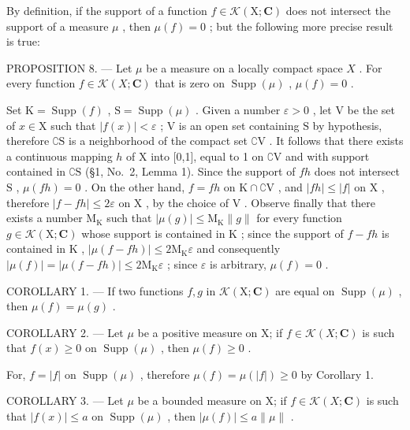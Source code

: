 By definition, if the support of a function \(f \in \mathcal{K}(\mathrm{X};\mathbf{C})\) does not intersect the support of a measure \(\mu\) , then \(\mu(f) = 0\) ; but the following more precise result is true:

PROPOSITION 8. --- Let \(\mu\) be a measure on a locally compact space \(X\) . For every function \(f \in \mathcal{K}(X; \mathbf{C})\) that is zero on \(\operatorname{Supp}(\mu)\) , \(\mu(f) = 0\) .

Set \(\mathrm{K} = \operatorname{Supp}(f)\) , \(\mathrm{S} = \operatorname{Supp}(\mu)\) . Given a number \(\varepsilon > 0\) , let \(\mathrm{V}\) be the set of \(x \in \mathrm{X}\) such that \(|f(x)| < \varepsilon\) ; \(\mathrm{V}\) is an open set containing \(\mathrm{S}\) by hypothesis, therefore \(\complement \mathrm{S}\) is a neighborhood of the compact set \(\complement \mathrm{V}\) . It follows that there exists a continuous mapping \(h\) of \(\mathrm{X}\) into {[}0,1{]}, equal to 1 on \(\complement \mathrm{V}\) and with support contained in \(\complement \mathrm{S}\) (§1, No.~2, Lemma 1). Since the support of \(fh\) does not intersect \(\mathrm{S}\) , \(\mu(fh) = 0\) . On the other hand, \(f = fh\) on \(\mathrm{K} \cap \complement \mathrm{V}\) , and \(|fh| \leqslant |f|\) on \(\mathrm{X}\) , therefore \(|f - fh| \leqslant 2\varepsilon\) on \(\mathrm{X}\) , by the choice of \(\mathrm{V}\) . Observe finally that there exists a number \(\mathrm{M}_{\mathrm{K}}\) such that \(|\mu(g)| \leqslant \mathrm{M}_{\mathrm{K}} \| g\|\) for every function \(g \in \mathcal{K}(\mathrm{X};\mathbf{C})\) whose support is contained in \(\mathrm{K}\) ; since the support of \(f - fh\) is contained in \(\mathrm{K}\) , \(|\mu(f - fh)| \leqslant 2\mathrm{M}_{\mathrm{K}}\varepsilon\) and consequently \(|\mu(f)| = |\mu(f - fh)| \leqslant 2\mathrm{M}_{\mathrm{K}}\varepsilon\) ; since \(\varepsilon\) is arbitrary, \(\mu(f) = 0\) .

COROLLARY 1. --- If two functions \(f, g\) in \(\mathcal{K}(\mathrm{X};\mathbf{C})\) are equal on \(\operatorname{Supp}(\mu)\) , then \(\mu(f) = \mu(g)\) .

COROLLARY 2. --- Let \(\mu\) be a positive measure on X; if \(f \in \mathcal{K}(X; \mathbf{C})\) is such that \(f(x) \geqslant 0\) on \(\operatorname{Supp}(\mu)\) , then \(\mu(f) \geqslant 0\) .

For, \(f = |f|\) on \(\operatorname{Supp}(\mu)\) , therefore \(\mu(f) = \mu(|f|) \geqslant 0\) by Corollary 1.

COROLLARY 3. --- Let \(\mu\) be a bounded measure on X; if \(f \in \mathcal{K}(X; \mathbf{C})\) is such that \(|f(x)| \leqslant a\) on \(\operatorname{Supp}(\mu)\) , then \(|\mu(f)| \leqslant a \| \mu \|\) .

